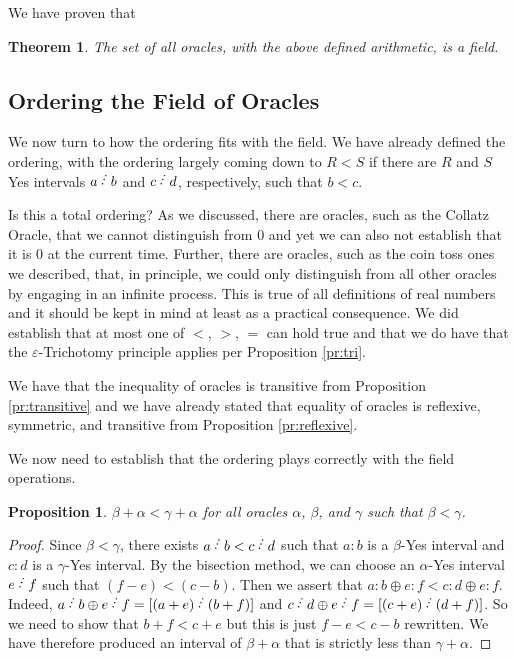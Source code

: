 \documentclass[12pt]{article}
\newtheorem{theorem}{Theorem}[subsection]
\newtheorem{proposition}{Proposition}[subsection]
\begin{document}
We have proven that

\begin{theorem}
The set of all oracles, with the above defined arithmetic, is a field. 
\end{theorem}

\subsection{Ordering the Field of Oracles}

We now turn to how the ordering fits with the field. We have already defined the ordering, with the ordering largely coming down to $R < S$ if there are $R$ and $S$ Yes intervals $a\lte b$ and $c\lte d$, respectively, such that $b<c$. 

Is this a total ordering? As we discussed, there are oracles, such as the Collatz Oracle, that we cannot distinguish from 0 and yet we can also not establish that it is 0 at the current time. Further, there are oracles, such as the coin toss ones we described, that, in principle, we could only distinguish from all other oracles by engaging in an infinite process. This is true of all definitions of real numbers and it should be kept in mind at least as a practical consequence.  We did establish that at most one of $<$, $>$, $=$ can hold true and that we do have that the $\varepsilon$-Trichotomy principle applies per Proposition \ref{pr:tri}.

We have that the inequality of oracles is transitive from Proposition \ref{pr:transitive} and we have already stated that equality of oracles is reflexive, symmetric, and transitive from Proposition \ref{pr:reflexive}. 

We now need to establish that the ordering plays correctly with the field operations. 

\begin{proposition}\label{pr:addinq}
 $\beta + \alpha< \gamma + \alpha$ for all oracles $\alpha$, $\beta$, and $\gamma$ such that $\beta < \gamma$.
\end{proposition}

\begin{proof}
Since $\beta < \gamma$, there exists $a\lte b< c\lte d$ such that $a:b$ is a $\beta$-Yes interval and $c:d$ is a $\gamma$-Yes interval. By the bisection method, we can choose an $\alpha$-Yes interval $e\lte f$ such that $ (f-e) <  (c-b)$. Then we assert that $a:b \oplus e:f  < c:d \oplus e:f$. Indeed, $a \lte b \oplus e \lte f = [(a+e) \lte (b+f)]$ and $c \lte d \oplus e \lte f = [(c+e)\lte (d+f)]$. So we need to show that $b+f < c+e$ but this is just $f-e < c-b$ rewritten. We have therefore produced an interval of $\beta+\alpha$ that is strictly less than $\gamma+\alpha$. 
\end{proof}
\end{document}
